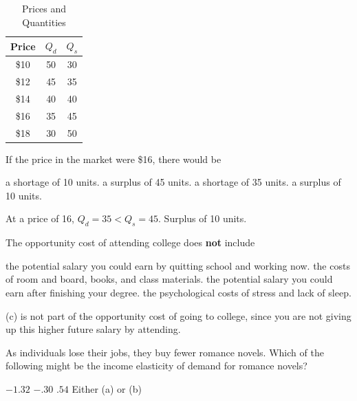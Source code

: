 \documentclass[addpoints,11pt]{exam}
\theoremstyle{definition}
\begin{document}
\begin{questions}
	
	\begin{table}[H]
		\caption{Prices and Quantities}
		\centering
		\begin{tabular}{ c|c|c} 
			
			Price & $Q_d$ & $Q_s$ \\
			\hline
			\$10 & 50 & 30 \\
			\$12 & 45 & 35 \\
			\$14 & 40 & 40 \\
			\$16 & 35 & 45 \\
			\$18 & 30 & 50 \\
		\end{tabular}
		\label{MC17}
	\end{table}
	
	If the price in the market were \$16, there would be
	
	\begin{choices}
		\choice a shortage of 10 units.
		\choice a surplus of 45 units.
		\choice a shortage of 35 units.
		\CorrectChoice a surplus of 10 units.
	\end{choices}
	
	\begin{solution}
		At a price of 16, $Q_d = 35 < Q_s = 45$. Surplus of 10 units.
	\end{solution}
		
	
	\question The opportunity cost of attending college does \textbf{not} include
	
	\begin{choices}
		\choice the potential salary you could earn by quitting school and working now.
		\choice the costs of room and board, books, and class materials.
		\CorrectChoice the potential salary you could earn after finishing your degree.
		\choice the psychological costs of stress and lack of sleep.
	\end{choices}
	
	\begin{solution}
		(c) is not part of the opportunity cost of going to college, since you are not giving up this higher future salary by attending.
	\end{solution}
	
	\question As individuals lose their jobs, they buy fewer romance novels. Which of the following might be the income elasticity of demand for romance novels?
	
	\begin{choices}
		\choice $-1.32$
		\choice $-.30$
		\CorrectChoice $.54$
		\choice Either (a) or (b)
	\end{choices}
	

\end{questions}
\end{document}
